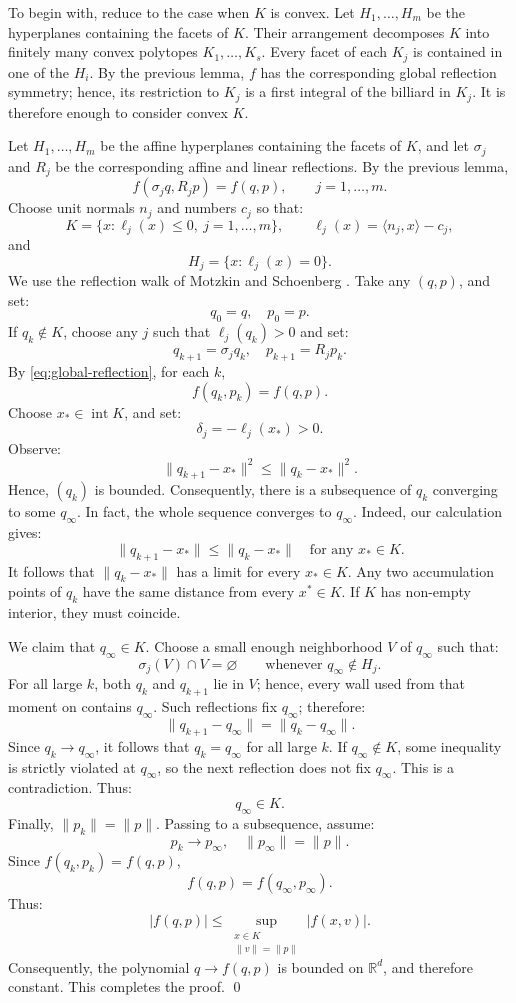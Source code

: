 \documentclass[12pt,reqno]{amsart}
\makeatletter
\renewenvironment{proof}[1][\proofname]{%
  \par\vspace{\topsep}%
  \normalfont\topsep6\p@\@plus6\p@\relax
  \trivlist
  \item[\hskip\labelsep\itshape #1\@addpunct{.}]\ignorespaces
}{%
  \endtrivlist
}
\numberwithin{equation}{section}
\def \R {\mathbb{R}}
\makeatother
\begin{document}
\begin{proof}[Proof of 
Theorem \ref{thm:birkhoff}] 
To begin with, reduce to the case when \(K\) is convex. Let
\(H_1,\ldots,H_m\) be the hyperplanes containing the facets of \(K\). Their arrangement decomposes \(K\) into finitely many convex 
polytopes \(K_1,\ldots,K_s\). Every facet of each \(K_j\) is contained in one of the \(H_i\). By the
previous lemma, \(f\) has the corresponding global reflection symmetry; hence, its restriction to \(K_j\) is a first integral of the billiard in \(K_j\). It is therefore enough to consider convex \(K\).
\smallskip%

Let \(H_1,\ldots,H_m\) be the affine hyperplanes containing the facets
of \(K\), and let \(\sigma_j\) and \(R_j\) be the corresponding affine
and linear reflections. By the previous lemma,
\begin{equation}\label{eq:global-reflection}
f(\sigma_j q,R_jp)=f(q,p),
\qquad j=1,\ldots,m.
\end{equation}
Choose unit normals \(n_j\) and numbers \(c_j\) so that:
\[
K=\{x:\ell_j(x)\le0,\ j=1,\ldots,m\},
\qquad
\ell_j(x)=\langle n_j,x\rangle-c_j,
\]
and
\[
H_j=\{x:\ell_j(x)=0\}.
\]
We use the reflection walk of Motzkin and Schoenberg
\cite{Motzkin-Sch}. Take any \((q,p)\), and set:
\[
q_0=q,\quad p_0=p.
\]
If \(q_k\notin K\), choose any \(j\) such that \(\ell_j(q_k)>0\) and set:
\[
q_{k+1}=\sigma_jq_k,
\quad
p_{k+1}=R_jp_k.
\]
By \eqref{eq:global-reflection}, for each \(k\),
\[
f(q_k,p_k)=f(q,p).
\]
Choose \(x_*\in\operatorname{int}K\), and set:
\[
\delta_j=-\ell_j(x_*)>0.
\]
Observe:
\[
\|q_{k+1}-x_*\|^2 \le \|q_k-x_*\|^2.
\]
Hence, \((q_k)\) is 
bounded. Consequently, there is a subsequence of \(q_k\) 
converging to some \(q_\infty\). In fact, the whole sequence converges to \(q_\infty\). Indeed, our calculation gives:
\[
\|q_{k+1}-x_*\| \le 
\|q_{k}-x_*\|\quad \text{for any 
\(x_* \in K\)}.
\]
It follows that \(\|q_k - x_{*}\|\) 
has a limit for every \(x_{*}\in K\). 
Any two accumulation points of \(q_k\) have the same distance from every
\(x^{*} \in K\). If \(K\) has non-empty interior, they must coincide.
\smallskip%

We claim that 
\(q_\infty\in K\). Choose a 
small enough neighborhood \(V\) of \(q_\infty\) such that:
\[
\sigma_j(V)\cap V=\varnothing
\qquad\text{whenever }q_\infty\notin H_j.
\]
For all large \(k\), both \(q_k\) and \(q_{k+1}\) lie in
\(V\); hence, every wall used from that moment on contains 
\(q_\infty\). Such reflections fix \(q_\infty\); therefore:
\[
\|q_{k+1}-q_\infty\|
=
\|q_k-q_\infty\|.
\]
Since \(q_k\to q_\infty\), 
it follows that \(q_k=q_\infty\) for all large \(k\). If \(q_\infty\notin K\), some inequality is strictly violated at \(q_\infty\), so the 
next reflection
does not fix \(q_\infty\). This is a contradiction. Thus: 
\[
q_{\infty} \in K.
\]
Finally, \(\|p_k\|=\|p\|\). Passing to a subsequence, assume:
\[
p_k\to p_\infty,
\quad
\|p_\infty\|=\|p\|.
\]
Since \(f(q_k,p_k)=f(q,p)\),
\[
f(q,p)=f(q_\infty,p_\infty).
\]
Thus:
\[
|f(q,p)|
\le
\sup_{\substack{x\in K\\ \|v\|=\|p\|}}
|f(x,v)|.
\]
Consequently, the
polynomial \(q\to f(q,p)\)
is bounded on \(\R^d\), and therefore constant. This completes the 
proof. \qed
\end{proof}
\end{document}
